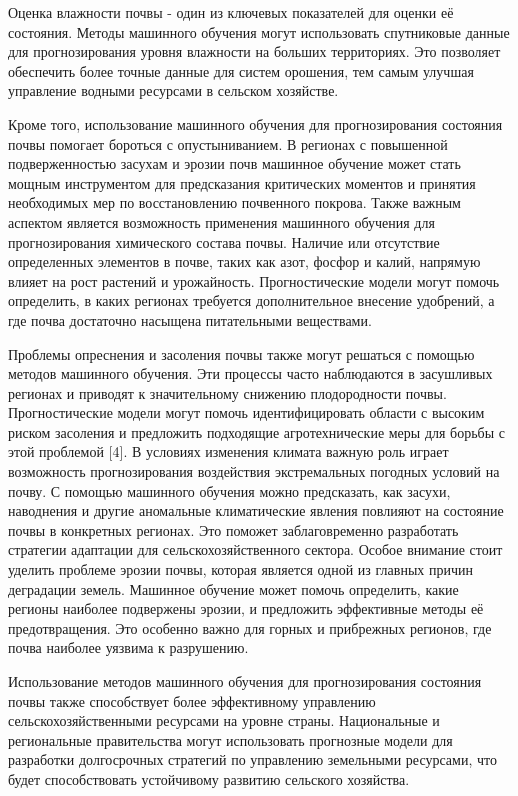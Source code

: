 Оценка влажности почвы - один из ключевых показателей для оценки её
состояния. Методы машинного обучения могут использовать спутниковые
данные для прогнозирования уровня влажности на больших территориях. Это
позволяет обеспечить более точные данные для систем орошения, тем самым
улучшая управление водными ресурсами в сельском хозяйстве.

Кроме того, использование машинного обучения для прогнозирования
состояния почвы помогает бороться с опустыниванием. В регионах с
повышенной подверженностью засухам и эрозии почв машинное обучение может
стать мощным инструментом для предсказания критических моментов и
принятия необходимых мер по восстановлению почвенного покрова. Также
важным аспектом является возможность применения машинного обучения для
прогнозирования химического состава почвы. Наличие или отсутствие
определенных элементов в почве, таких как азот, фосфор и калий, напрямую
влияет на рост растений и урожайность. Прогностические модели могут
помочь определить, в каких регионах требуется дополнительное внесение
удобрений, а где почва достаточно насыщена питательными веществами.

Проблемы опреснения и засоления почвы также могут решаться с помощью
методов машинного обучения. Эти процессы часто наблюдаются в засушливых
регионах и приводят к значительному снижению плодородности почвы.
Прогностические модели могут помочь идентифицировать области с высоким
риском засоления и предложить подходящие агротехнические меры для борьбы
с этой проблемой {[}4{]}. В условиях изменения климата важную роль
играет возможность прогнозирования воздействия экстремальных погодных
условий на почву. С помощью машинного обучения можно предсказать, как
засухи, наводнения и другие аномальные климатические явления повлияют на
состояние почвы в конкретных регионах. Это поможет заблаговременно
разработать стратегии адаптации для сельскохозяйственного сектора.
Особое внимание стоит уделить проблеме эрозии почвы, которая является
одной из главных причин деградации земель. Машинное обучение может
помочь определить, какие регионы наиболее подвержены эрозии, и
предложить эффективные методы её предотвращения. Это особенно важно для
горных и прибрежных регионов, где почва наиболее уязвима к разрушению.

Использование методов машинного обучения для прогнозирования состояния
почвы также способствует более эффективному управлению
сельскохозяйственными ресурсами на уровне страны. Национальные и
региональные правительства могут использовать прогнозные модели для
разработки долгосрочных стратегий по управлению земельными ресурсами,
что будет способствовать устойчивому развитию сельского хозяйства.


